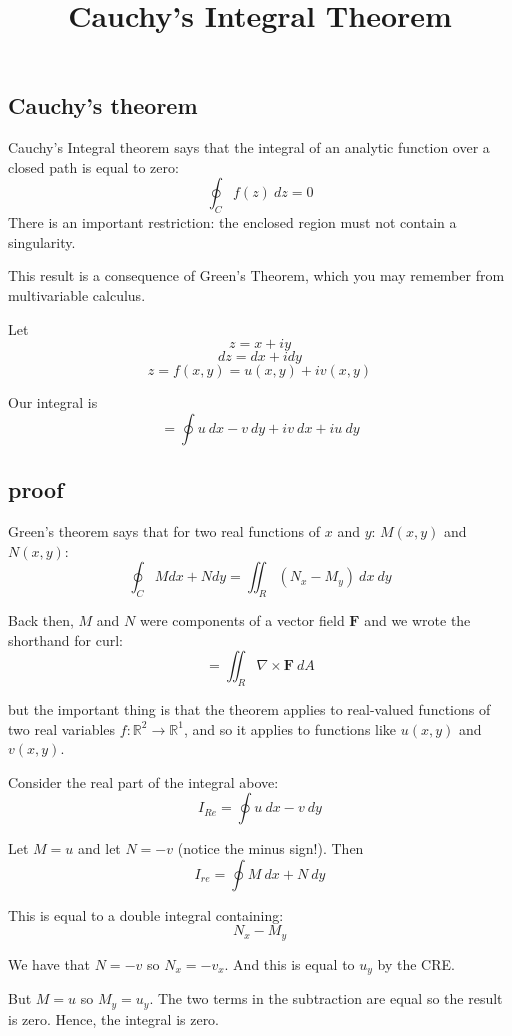 \documentclass[11pt, oneside]{article}
\title{Cauchy's Integral Theorem}
\date{}
\begin{document}
\maketitle
\Large


\subsection*{Cauchy's theorem}

Cauchy's Integral theorem says that the integral of an analytic function over a closed path is equal to zero:
\[ \oint_C f(z) \ dz = 0 \]
There is an important restriction:  the enclosed region must not contain a singularity.

This result is a consequence of Green's Theorem, which you may remember from multivariable calculus.  

Let
\[ z = x + i y \]
\[ dz = dx + i dy \]
\[ z = f(x,y) = u(x,y) + iv(x,y) \]

Our integral is
\[ =  \oint u \ dx - v \ dy + i v \ dx + i u \ dy \]

\subsection*{proof}

Green's theorem says that for two real functions of $x$ and $y$:  $M(x,y)$ and $N(x,y)$:
\[ \oint_C M dx + N dy = \iint_R (N_x - M_y) \ dx \ dy \]

Back then, $M$ and $N$ were components of a vector field $\mathbf{F}$ and we wrote the shorthand for curl:
\[ = \iint_R \nabla \times \mathbf{F} \ dA\]

but the important thing is that the theorem applies to real-valued functions of two real variables $f: \mathbb{R}^2 \rightarrow \mathbb{R}^1$, and so it applies to functions like $u(x,y)$ and $v(x,y)$.

Consider the real part of the integral above:
\[ I_{Re} = \oint u \ dx - v \ dy \]

Let $M = u$ and let $N = - v$ (notice the minus sign!).  Then
\[ I_{re} = \oint M \ dx + N \ dy \]

This is equal to a double integral containing:
\[ N_x - M_y \]

We have that $N = -v$ so $N_x = - v_x$.  And this is equal to $u_y$ by the CRE.

But $M = u$ so $M_y = u_y$. The two terms in the subtraction are equal so the result is zero.  Hence, the integral is zero.
\end{document}
